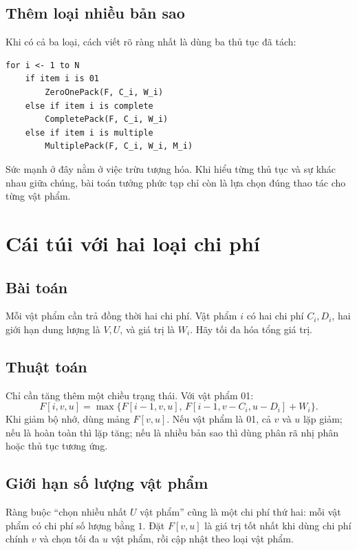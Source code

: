 \documentclass[11pt]{article}
\begin{document}
\subsection{Thêm loại nhiều bản sao}

Khi có cả ba loại, cách viết rõ ràng nhất là dùng ba thủ tục đã tách:
\begin{verbatim}
for i <- 1 to N
    if item i is 01
        ZeroOnePack(F, C_i, W_i)
    else if item i is complete
        CompletePack(F, C_i, W_i)
    else if item i is multiple
        MultiplePack(F, C_i, W_i, M_i)
\end{verbatim}

Sức mạnh ở đây nằm ở việc trừu tượng hóa. Khi hiểu từng thủ tục và sự khác
nhau giữa chúng, bài toán tưởng phức tạp chỉ còn là lựa chọn đúng thao tác cho
từng vật phẩm.

\section{Cái túi với hai loại chi phí}

\subsection{Bài toán}

Mỗi vật phẩm cần trả đồng thời hai chi phí. Vật phẩm \(i\) có hai chi phí
\(C_i,D_i\), hai giới hạn dung lượng là \(V,U\), và giá trị là \(W_i\). Hãy
tối đa hóa tổng giá trị.

\subsection{Thuật toán}

Chỉ cần tăng thêm một chiều trạng thái. Với vật phẩm 01:
\[
  F[i,v,u]=
  \max\{F[i-1,v,u],\,F[i-1,v-C_i,u-D_i]+W_i\}.
\]
Khi giảm bộ nhớ, dùng mảng \(F[v,u]\). Nếu vật phẩm là 01, cả \(v\) và \(u\)
lặp giảm; nếu là hoàn toàn thì lặp tăng; nếu là nhiều bản sao thì dùng phân rã
nhị phân hoặc thủ tục tương ứng.

\subsection{Giới hạn số lượng vật phẩm}

Ràng buộc ``chọn nhiều nhất \(U\) vật phẩm'' cũng là một chi phí thứ hai: mỗi
vật phẩm có chi phí số lượng bằng \(1\). Đặt \(F[v,u]\) là giá trị tốt nhất
khi dùng chi phí chính \(v\) và chọn tối đa \(u\) vật phẩm, rồi cập nhật theo
loại vật phẩm.
\end{document}
